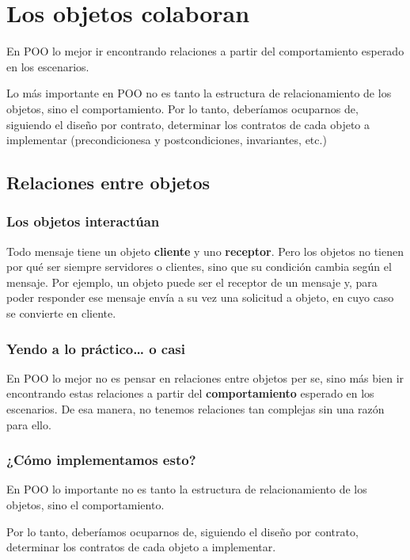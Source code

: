 \documentclass[../main.tex]{subfiles}
\begin{document}
\section{Los objetos colaboran} 
    En POO lo mejor ir encontrando relaciones a partir del comportamiento esperado en los escenarios.

    Lo más importante en POO no es tanto la estructura de relacionamiento de los objetos, sino el comportamiento. Por lo tanto, deberíamos ocuparnos de, siguiendo el diseño por contrato,  determinar los contratos de cada objeto a implementar (precondicionesa y postcondiciones, invariantes, etc.) 

    \subsection{Relaciones entre objetos}
        \subsubsection{Los objetos interactúan}
            Todo mensaje tiene un objeto \textbf{cliente} y uno \textbf{receptor}. Pero los objetos no tienen por qué ser siempre servidores o clientes, sino que su condición cambia según el mensaje. Por ejemplo, un objeto puede ser el receptor de un mensaje y, para poder responder ese mensaje envía a su vez una solicitud a objeto, en cuyo caso se convierte en cliente.

        \subsubsection{Yendo a lo práctico… o casi}
            En POO lo mejor no es pensar en relaciones entre objetos per se, sino más bien ir encontrando estas relaciones a partir del \textbf{comportamiento} esperado en los escenarios. De esa manera, no tenemos relaciones tan complejas sin una razón para ello.

        \subsubsection{¿Cómo implementamos esto?}
            En POO lo importante no es tanto la estructura de relacionamiento de los objetos, sino el comportamiento.

            Por lo tanto, deberíamos ocuparnos de, siguiendo el diseño por contrato, determinar los contratos de cada objeto a implementar.
\end{document}

